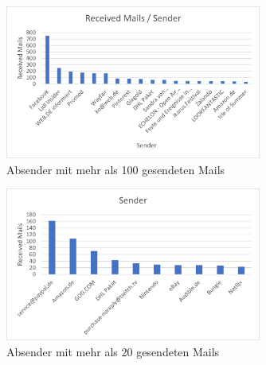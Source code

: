 \begin{figure}
    \centering
    \includegraphics[width=0.75\textwidth]{images/Auswertung_Empfange_Emails.png}
    \caption{Absender mit mehr als 100 gesendeten Mails} 
    \label{fig:receivedemails}
\end{figure}

\begin{figure}
    \centering
    \includegraphics[width=0.75\textwidth]{images/Merged_Auswertung_Empfange_Emails.png}
    \caption{Absender mit mehr als 20 gesendeten Mails} 
    \label{fig:receivedemailsmerged}
\end{figure}